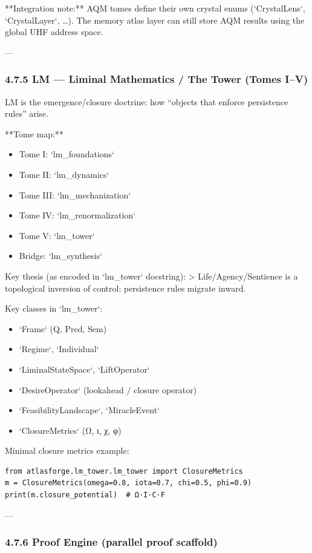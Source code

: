 \documentclass[11pt]{article}
\begin{document}
**Integration note:** AQM tomes define their own crystal enums (`CrystalLens`, `CrystalLayer`, …).  
The memory atlas layer can still store AQM results using the global UHF address space.

---

\subsubsection{4.7.5 LM — Liminal Mathematics / The Tower (Tomes I–V)}

LM is the emergence/closure doctrine: how “objects that enforce persistence rules” arise.

**Tome map:**
\begin{itemize}
\item Tome I: `lm\_foundations`
\item Tome II: `lm\_dynamics`
\item Tome III: `lm\_mechanization`
\item Tome IV: `lm\_renormalization`
\item Tome V: `lm\_tower`
\item Bridge: `lm\_synthesis`
\end{itemize}

Key thesis (as encoded in `lm\_tower` docstring):
> Life/Agency/Sentience is a topological inversion of control: persistence rules migrate inward.

Key classes in `lm\_tower`:
\begin{itemize}
\item `Frame` (Q, Pred, Sem)
\item `Regime`, `Individual`
\item `LiminalStateSpace`, `LiftOperator`
\item `DesireOperator` (lookahead / closure operator)
\item `FeasibilityLandscape`, `MiracleEvent`
\item `ClosureMetrics` (Ω, ι, χ, φ)
\end{itemize}

Minimal closure metrics example:

\begin{lstlisting}
from atlasforge.lm_tower.lm_tower import ClosureMetrics
m = ClosureMetrics(omega=0.8, iota=0.7, chi=0.5, phi=0.9)
print(m.closure_potential)  # Ω·I·C·F
\end{lstlisting}

---

\subsubsection{4.7.6 Proof Engine (parallel proof scaffold)}
\end{document}
